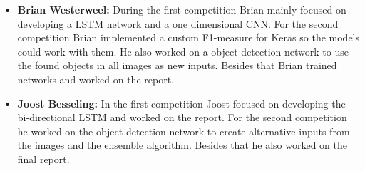 \documentclass[twocolumn]{article}
\begin{document}
\begin{itemize}
	        \item \textbf{Brian Westerweel:} During the first competition Brian mainly focused on developing a LSTM network and a one dimensional CNN. For the second competition Brian implemented a custom F1-measure for Keras so the models could work with them. He also worked on a object detection network to use the found objects in all images as new inputs. Besides that Brian trained networks and worked on the report.
            
	        \item \textbf{Joost Besseling:} In the first competition Joost focused on developing the bi-directional LSTM and worked on the report. For the second competition he worked on the object detection network to create alternative inputs from the images and the ensemble algorithm. Besides that he also worked on the final report.
	    \end{itemize}


	
	
	
\end{document}
